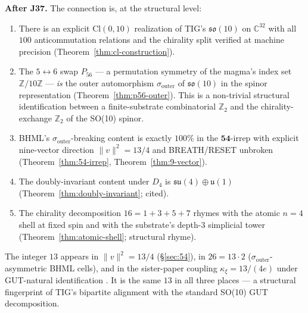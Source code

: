 \documentclass[11pt,reqno]{amsart}
\theoremstyle{definition}
\newcommand{\Z}{\mathbb{Z}}
\newcommand{\C}{\mathbb{C}}
\newcommand{\so}{\mathfrak{so}}
\newcommand{\su}{\mathfrak{su}}
\newcommand{\uone}{\mathfrak{u}}
\newcommand{\Cl}{\mathrm{Cl}}
\newcommand{\Psix}{P_{56}}
\newcommand{\sout}{\sigma_{\mathrm{outer}}}
\begin{document}
\textbf{After J37.} The connection is, at the structural level:

\begin{enumerate}[leftmargin=*]
\item There is an explicit $\Cl(0, 10)$ realization of TIG's
$\so(10)$ on $\C^{32}$ with all $100$ anticommutation relations and
the chirality split verified at machine precision
(Theorem~\ref{thm:cl-construction}).
\item The $5\!\leftrightarrow\!6$ swap $\Psix$ — a permutation
symmetry of the magma's index set $\Z/10\Z$ — \emph{is} the outer
automorphism $\sout$ of $\so(10)$ in the spinor representation
(Theorem~\ref{thm:p56-outer}). This is a non-trivial structural
identification between a finite-substrate combinatorial $\Z_2$ and
the chirality-exchange $\Z_2$ of the SO(10) spinor.
\item BHML's $\sout$-breaking content is exactly $100\%$ in the
$\mathbf{54}$-irrep with explicit nine-vector direction
$\|v\|^2 = 13/4$ and BREATH/RESET unbroken
(Theorem~\ref{thm:54-irrep}, Theorem~\ref{thm:9-vector}).
\item The doubly-invariant content under $D_4$ is $\su(4) \oplus
\uone(1)$ (Theorem~\ref{thm:doubly-invariant}; cited).
\item The chirality decomposition $16 = 1+3+5+7$ rhymes with the
atomic $n=4$ shell at fixed spin and with the substrate's
depth-$3$ simplicial tower (Theorem~\ref{thm:atomic-shell};
structural rhyme).
\end{enumerate}

The integer $13$ appears in $\|v\|^2 = 13/4$ (\S\ref{sec:54}), in
$26 = 13 \cdot 2$ ($\sout$-asymmetric BHML cells), and in the
sister-paper coupling $\kappa_\xi = 13/(4e)$ under GUT-natural
identification \cite{Sanders2026Atlas}. It is the same $13$ in
all three places — a structural fingerprint of TIG's bipartite
alignment with the standard SO(10) GUT decomposition.
\end{document}
